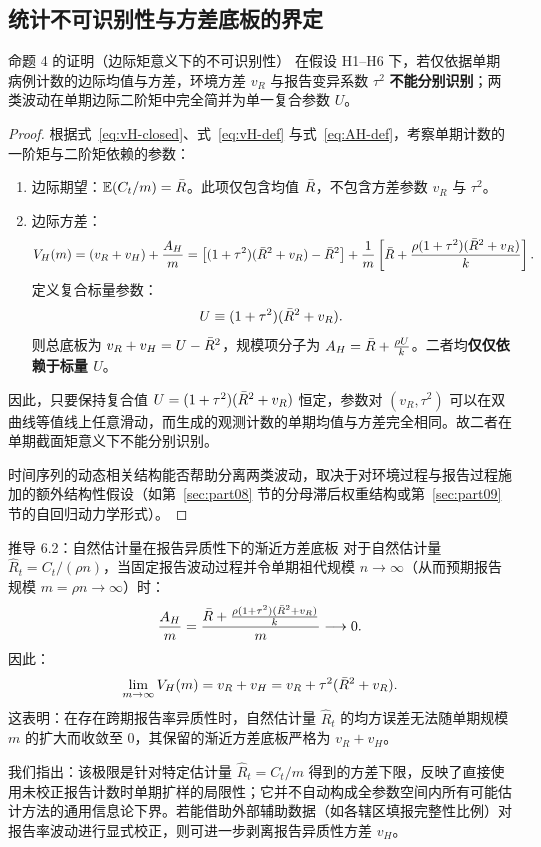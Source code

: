 \subsection{统计不可识别性与方差底板的界定}

\begin{theorembox}{命题 4 的证明（边际矩意义下的不可识别性）}
在假设 H1--H6 下，若仅依据单期病例计数的边际均值与方差，环境方差 $v_R$ 与报告变异系数 $\tau^2$ \textbf{不能分别识别}；两类波动在单期边际二阶矩中完全简并为单一复合参数 $U$。
\end{theorembox}

\begin{proof}
根据式~\eqref{eq:vH-closed}、式~\eqref{eq:vH-def} 与式~\eqref{eq:AH-def}，考察单期计数的一阶矩与二阶矩依赖的参数：
\begin{enumerate}
  \item 边际期望：$\mathbb{E}(C_t / m) = \bar{R}$。此项仅包含均值 $\bar{R}$，不包含方差参数 $v_R$ 与 $\tau^2$。
  \item 边际方差：
  \begin{equation}
    V_H(m) = (v_R + v_H) + \frac{A_H}{m} = \big[ (1+\tau^2)(\bar{R}^2+v_R) - \bar{R}^2 \big] + \frac{1}{m}\left[ \bar{R} + \frac{\rho(1+\tau^2)(\bar{R}^2+v_R)}{k} \right].
  \end{equation}
  定义复合标量参数：
  \begin{equation}
    U \equiv (1+\tau^2)(\bar{R}^2 + v_R).
  \end{equation}
  则总底板为 $v_R + v_H = U - \bar{R}^2$，规模项分子为 $A_H = \bar{R} + \frac{\rho U}{k}$。二者均\textbf{仅仅依赖于标量 $U$}。
\end{enumerate}
因此，只要保持复合值 $U = (1+\tau^2)(\bar{R}^2+v_R)$ 恒定，参数对 $(v_R, \tau^2)$ 可以在双曲线等值线上任意滑动，而生成的观测计数的单期均值与方差完全相同。故二者在单期截面矩意义下不能分别识别。

时间序列的动态相关结构能否帮助分离两类波动，取决于对环境过程与报告过程施加的额外结构性假设（如第~\ref{sec:part08} 节的分母滞后权重结构或第~\ref{sec:part09} 节的自回归动力学形式）。
\end{proof}

\begin{derivationbox}{推导 6.2：自然估计量在报告异质性下的渐近方差底板}
对于自然估计量 $\widehat{R}_t = C_t / (\rho n)$，当固定报告波动过程并令单期祖代规模 $n \to \infty$（从而预期报告规模 $m = \rho n \to \infty$）时：
\begin{equation}
  \frac{A_H}{m} = \frac{\bar{R} + \frac{\rho(1+\tau^2)(\bar{R}^2+v_R)}{k}}{m} \longrightarrow 0.
\end{equation}
因此：
\begin{equation}
  \lim_{m \to \infty} V_H(m) = v_R + v_H = v_R + \tau^2(\bar{R}^2 + v_R).
\end{equation}
这表明：在存在跨期报告率异质性时，自然估计量 $\widehat{R}_t$ 的均方误差无法随单期规模 $m$ 的扩大而收敛至 0，其保留的渐近方差底板严格为 $v_R + v_H$。

我们指出：该极限是针对特定估计量 $\widehat{R}_t = C_t/m$ 得到的方差下限，反映了直接使用未校正报告计数时单期扩样的局限性；它并不自动构成全参数空间内所有可能估计方法的通用信息论下界。若能借助外部辅助数据（如各辖区填报完整性比例）对报告率波动进行显式校正，则可进一步剥离报告异质性方差 $v_H$。
\end{derivationbox}
